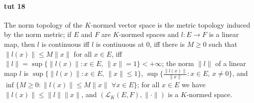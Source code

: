 \documentclass[a4paper]{article}
\newcommand{\Lcal}{\mathcal{L}}
\begin{document}


\paragraph{tut 18} %
\label{par:tut_18}

The norm topology of the $K$-normed vector space is the metric topology induced by
the norm metric;
%
if $E$ and $F$ are $K$-normed spaces and $l\colon E \to F$ is a linear map, then
$l$ is continuous iff $l$ is continuous at $0$, iff there is $M\geq 0$ such that
$\|l(x)\| \leq M \|x\|$ for all $x\in E$, iff
$\|l\| = \sup\{\|l(x)\|\colon x\in E,\, \|x\|=1\} < +\infty$;
%
the norm $\|l\|$ of a linear map $l$ is $\sup\{\|l(x)\|\colon x\in E,\, \|x\| \leq 1\}$,
$\sup\{\tfrac{\|l(x)\|}{\|x\|} \colon x\in E,\, x\neq 0\}$, and
$\inf\{M\geq 0\colon \|l(x)\| \leq M \|x\|\,\,\forall{x\in E} \}$;
%
for all $x\in E$ we have $\|l(x)\| \leq \|l\| \|x\|$, and $(\Lcal_K(E, F), \|\cdot\|)$
is a $K$-normed space.
\end{document}
